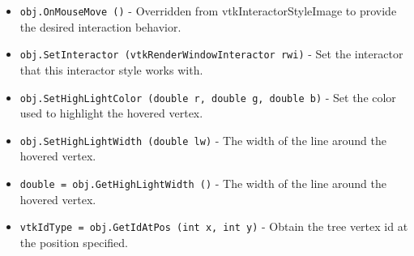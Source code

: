\begin{itemize}
\item  \verb|obj.OnMouseMove ()| -  Overridden from vtkInteractorStyleImage to provide the desired
 interaction behavior.

\item  \verb|obj.SetInteractor (vtkRenderWindowInteractor rwi)| -  Set the interactor that this interactor style works with.

\item  \verb|obj.SetHighLightColor (double r, double g, double b)| -  Set the color used to highlight the hovered vertex.

\item  \verb|obj.SetHighLightWidth (double lw)| -  The width of the line around the hovered vertex.

\item  \verb|double = obj.GetHighLightWidth ()| -  The width of the line around the hovered vertex.

\item  \verb|vtkIdType = obj.GetIdAtPos (int x, int y)| -  Obtain the tree vertex id at the position specified.

\end{itemize}
